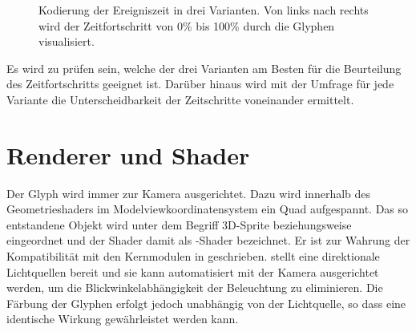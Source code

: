 \begin{figure}
	{\caption{Kodierung der Ereigniszeit in drei Varianten. Von links nach rechts wird der Zeitfortschritt von 0\% bis 100\% durch die Glyphen visualisiert.}\label{fig:visualisierung:glyph-zeit}}
\end{figure}

Es wird zu prüfen sein, welche der drei Varianten am Besten für die Beurteilung des Zeitfortschritts geeignet ist. Darüber hinaus wird mit der Umfrage für jede Variante die Unterscheidbarkeit der Zeitschritte voneinander ermittelt. 


\section{Renderer und Shader}\label{sec:renderer}

Der Glyph wird immer zur Kamera ausgerichtet. Dazu wird innerhalb des Geometrieshaders im Modelviewkoordinatensystem ein Quad aufgespannt. Das so entstandene Objekt wird unter dem Begriff 3D-Sprite beziehungsweise  eingeordnet und der Shader damit als -Shader bezeichnet. Er ist zur Wahrung der Kompatibilität mit den  Kernmodulen in  geschrieben.  stellt eine direktionale Lichtquellen bereit und sie kann automatisiert mit der Kamera ausgerichtet werden, um die Blickwinkelabhängigkeit der Beleuchtung zu eliminieren. Die Färbung der Glyphen erfolgt jedoch unabhängig von der Lichtquelle, so dass eine identische Wirkung gewährleistet werden kann.

